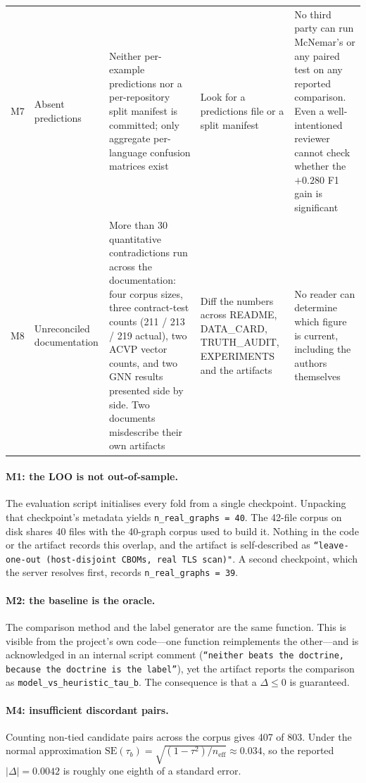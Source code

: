 \documentclass[conference]{IEEEtran}
\newcommand{\code}[1]{\texttt{\small #1}}
\begin{document}
\begin{table}[t]
\begin{tabular}{@{}p{0.9cm}p{3.0cm}p{3.4cm}p{3.6cm}p{3.6cm}@{}}
\addlinespace
M7 & Absent predictions &
Neither per-example predictions nor a per-repository split manifest is committed; only aggregate per-language confusion matrices exist &
Look for a predictions file or a split manifest &
No third party can run McNemar's or any paired test on any reported comparison. Even a well-intentioned reviewer cannot check whether the $+0.280$ F1 gain is significant \\
\addlinespace
M8 & Unreconciled documentation &
More than 30 quantitative contradictions run across the documentation: four corpus sizes, three contract-test counts (211 / 213 / 219 actual), two ACVP vector counts, and two GNN results presented side by side. Two documents misdescribe their own artifacts &
Diff the numbers across README, DATA\_CARD, TRUTH\_AUDIT, EXPERIMENTS and the artifacts &
No reader can determine which figure is current, including the authors themselves \\
\bottomrule
\end{tabular}
\end{table}

\paragraph{M1: the LOO is not out-of-sample.} The evaluation script initialises every fold
from a single checkpoint. Unpacking that checkpoint's metadata yields
\code{n\_real\_graphs = 40}. The 42-file corpus on disk shares 40 files with the
40-graph corpus used to build it. Nothing in the code or the artifact records this
overlap, and the artifact is self-described as \code{``leave-one-out (host-disjoint CBOMs,
real TLS scan)"}. A second checkpoint, which the server resolves first, records
\code{n\_real\_graphs = 39}.

\paragraph{M2: the baseline is the oracle.} The comparison method and the label generator
are the same function. This is visible from the project's own code---one function
reimplements the other---and is acknowledged in an internal script comment
(\code{``neither beats the doctrine, because the doctrine is the label''}), yet the
artifact reports the comparison as \code{model\_vs\_heuristic\_tau\_b}. The consequence is
that a $\Delta\le 0$ is guaranteed.

\paragraph{M4: insufficient discordant pairs.} Counting non-tied candidate pairs across
the corpus gives 407 of 803. Under the normal approximation
$\mathrm{SE}(\tau_b)=\sqrt{(1-\tau^2)/n_{\text{eff}}}\approx 0.034$, so the reported
$|\Delta|=0.0042$ is roughly one eighth of a standard error.
\end{document}

